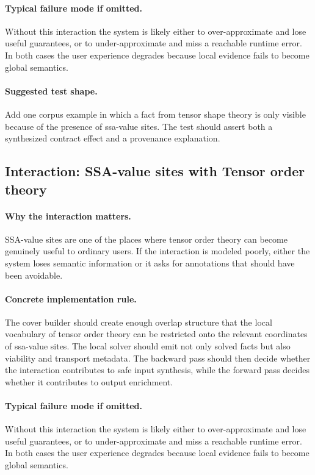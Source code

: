 \documentclass[11pt]{report}
\theoremstyle{definition}
\theoremstyle{plain}
\begin{document}
\paragraph{Typical failure mode if omitted.}
Without this interaction the system is likely either to over-approximate and
lose useful guarantees, or to under-approximate and miss a reachable runtime
error. In both cases the user experience degrades because local evidence
fails to become global semantics.

\paragraph{Suggested test shape.}
Add one corpus example in which a fact from tensor shape theory is only
visible because of the presence of ssa-value sites. The test should
assert both a synthesized contract effect and a provenance explanation.

\subsection{Interaction: SSA-value sites with Tensor order theory}

\paragraph{Why the interaction matters.}
SSA-value sites are one of the places where tensor order theory can become
genuinely useful to ordinary users. If the interaction is modeled poorly,
either the system loses semantic information or it asks for annotations that
should have been avoidable.

\paragraph{Concrete implementation rule.}
The cover builder should create enough overlap structure that the local
vocabulary of tensor order theory can be restricted onto the relevant
coordinates of ssa-value sites. The local solver should emit not only
solved facts but also viability and transport metadata. The backward pass
should then decide whether the interaction contributes to safe input
synthesis, while the forward pass decides whether it contributes to output
enrichment.

\paragraph{Typical failure mode if omitted.}
Without this interaction the system is likely either to over-approximate and
lose useful guarantees, or to under-approximate and miss a reachable runtime
error. In both cases the user experience degrades because local evidence
fails to become global semantics.
\end{document}
